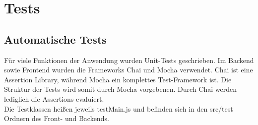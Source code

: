 \section{Tests}\label{Tests}
\subsection{Automatische Tests}
Für viele Funktionen der Anwendung wurden Unit-Tests geschrieben.
Im Backend sowie Frontend wurden die Frameworks Chai und Mocha verwendet.
Chai ist eine Assertion Library, während Mocha ein komplettes Test-Framework ist.
Die Struktur der Tests wird somit durch Mocha vorgebenen.
Durch Chai werden lediglich die Assertions evaluiert.
\\
Die Testklassen heißen jeweils testMain.js und befinden sich in den src/test Ordnern des Front- und Backends.
\\

